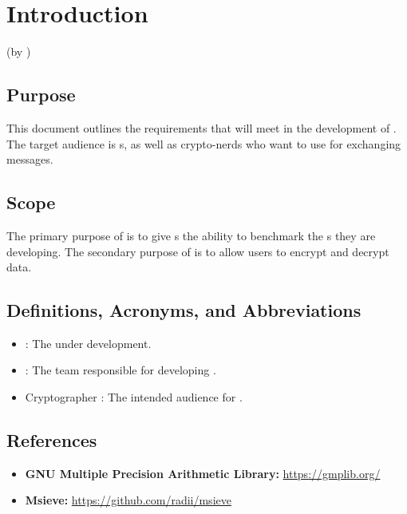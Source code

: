 \section{Introduction}
(by \md)


\subsection{Purpose}

This document outlines the requirements that \tc{} will meet
in the development of \cry{}. The target audience is \cg s,
as well as crypto-nerds who want to use
\cry{} for exchanging messages.


\subsection{Scope}

The primary purpose of \cry{} is to give \cg s the ability
to benchmark the \cs s they are developing. The secondary
purpose of \cry{} is to allow users to encrypt and decrypt
data.


\subsection{Definitions, Acronyms, and Abbreviations}

\begin{itemize}
\item \cry{}: The \cf{}  under development.
\item \tc{}: The team responsible for developing \cry{}.
\item Cryptographer : The intended audience for \cry{}.
\end{itemize}


\subsection{References}

\begin{itemize}
  \item \textbf{GNU Multiple Precision Arithmetic Library:}
        \url{https://gmplib.org/}
  \item \textbf{Msieve:} \url{https://github.com/radii/msieve}
\end{itemize}

